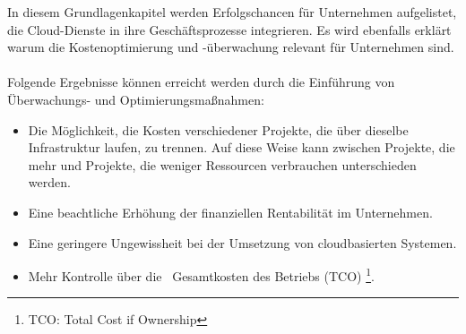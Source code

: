 In diesem Grundlagenkapitel werden Erfolgschancen für Unternehmen aufgelistet, die Cloud-Dienste in ihre Geschäftsprozesse integrieren.
Es wird ebenfalls erklärt warum die Kostenoptimierung und -überwachung relevant für Unternehmen sind.
\\\\
Folgende Ergebnisse können erreicht werden durch die Einführung von Überwachungs- und Optimierungsmaßnahmen:
\begin{itemize}
      \item
            Die Möglichkeit, die Kosten verschiedener Projekte, die über dieselbe Infrastruktur laufen, zu trennen.
            Auf diese Weise kann zwischen Projekte, die mehr und Projekte, die weniger Ressourcen verbrauchen unterschieden werden.%
      \item
            Eine beachtliche Erhöhung der finanziellen Rentabilität im Unternehmen.
      \item
            Eine geringere Ungewissheit bei der Umsetzung von cloudbasierten Systemen.
      \item
            Mehr Kontrolle über die  Gesamtkosten des Betriebs (TCO)     \footnote{TCO: Total Cost if Ownership}.

\end{itemize}




